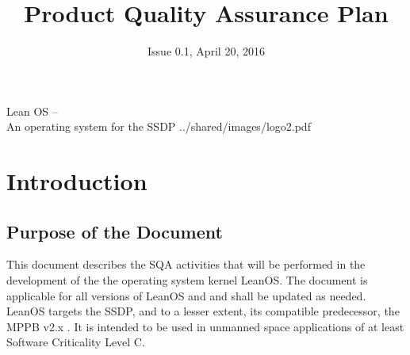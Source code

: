 

\title{Product Quality Assurance Plan}
\def \documentid {LEANOS-UVIE-PAQ-001}
\date{Issue 0.1, April 20, 2016}

\newcommand\affil[1]{\textsuperscript#1}

\def\preparedby {Armin Luntzer\affil{1}}
\def\checkedby {Roland Ottensamer\affil{1}}
\def\approvedby {Franz Kerschbaum\affil{1}}

\def\affiliations{
	\affil{1} Department of Astrophysics, University of Vienna
}








 
\usepackage{multicol}
\usepackage{enumitem}
\usepackage{vhistory}

\usepackage{biblatex}








\setmainfont{MyriadPro-SemiCondensed}
\uvietitlepage%
{Lean OS --\\ An operating system for the SSDP}%
{\doctitle}%
{../shared/images/logo2.pdf}
\setmainfont{MyriadPro}

\approvalpage

\tableofcontents
\newpage



\begin{versionhistory}
\end{versionhistory}


\chapter{Introduction}

\section{Purpose of the Document}


This document describes the \gls{SQA} activities that will be
performed in the development of the the operating system kernel LeanOS.
The document is applicable for all versions of LeanOS and and shall be updated
as needed.\\

\noindent
LeanOS targets the \gls{SSDP}, and to a lesser extent, its
compatible predecessor, the \gls{MPPB} v2.x \cite{MPPB}.
It is intended to be used in unmanned space applications of at least
Software Criticality Level C. \\

